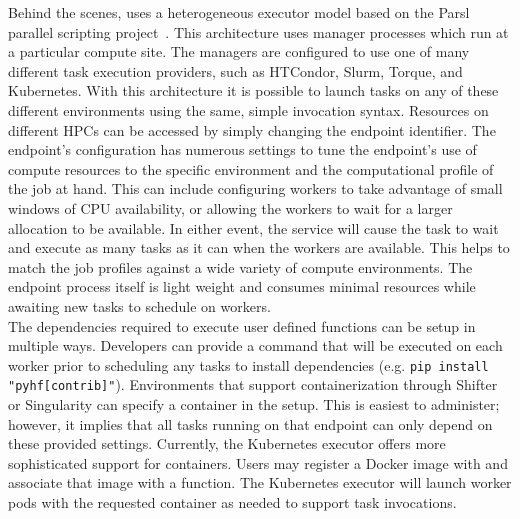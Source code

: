Behind the scenes, \funcX{} uses a heterogeneous executor model based on the Parsl parallel scripting project~\cite{Parsl_paper}.
This architecture uses manager processes which run at a particular compute site.
The managers are configured to use one of many different task execution providers, such as HTCondor, Slurm, Torque, and Kubernetes.
With this architecture it is possible to launch tasks on any of these different environments using the same, simple invocation syntax.
Resources on different HPCs can be accessed by simply changing the endpoint identifier.
The endpoint's configuration has numerous settings to tune the endpoint's use of compute resources to the specific environment and the computational profile of the job at hand.
This can include configuring workers to take advantage of small windows of CPU availability, or allowing the workers to wait for a larger allocation to be available.
In either event, the \funcX{} service will cause the task to wait and execute as many tasks as it can when the workers are available.
This helps to match the job profiles against a wide variety of compute environments.
The endpoint process itself is light weight and consumes minimal resources while awaiting new tasks to schedule on workers.\\

The dependencies required to execute user defined functions can be setup in multiple ways.
Developers can provide a command that will be executed on each worker prior to scheduling any tasks to install dependencies (e.g. \texttt{pip install "pyhf[contrib]"}).
Environments that support containerization through Shifter or Singularity can specify a container in the setup.
This is easiest to administer; however, it implies that all tasks running on that endpoint can only depend on these provided settings.
Currently, the Kubernetes executor offers more sophisticated support for containers.
Users may register a Docker image with \funcX{} and associate that image with a function.
The Kubernetes executor will launch worker pods with the requested container as needed to support task invocations.
